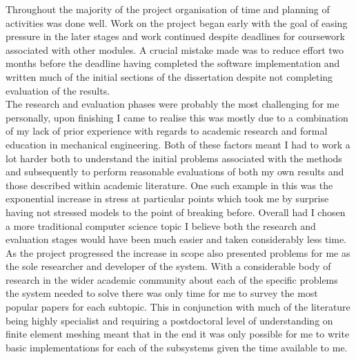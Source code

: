 \noindent
Throughout the majority of the project organisation of time and planning of activities was done well. Work on the project began early with the goal of easing pressure in the later stages and work continued despite deadlines for coursework associated with other modules. A crucial mistake made was to reduce effort two months before the deadline having completed the software implementation and written much of the initial sections of the dissertation despite not completing evaluation of the results. \\

\noindent
The research and evaluation phases were probably the most challenging for me personally, upon finishing I came to realise this was mostly due to a combination of my lack of prior experience with regards to academic research and formal education in mechanical engineering. Both of these factors meant I had to work a lot harder both to understand the initial problems associated with the methods and subsequently to perform reasonable evaluations of both my own results and those described within academic literature. One such example in this was the exponential increase in stress at particular points which took me by surprise having not stressed models to the point of breaking before. Overall had I chosen a more traditional computer science topic I believe both the research and evaluation stages would have been much easier and taken considerably less time. \\ 

\noindent
As the project progressed the increase in scope also presented problems for me as the sole researcher and developer of the system. With a considerable body of research in the wider academic community about each of the specific problems the system needed to solve there was only time for me to survey the most popular papers for each subtopic. This in conjunction with much of the literature being highly specialist and requiring a postdoctoral level of understanding on finite element meshing meant that in the end it was only possible for me to write basic implementations for each of the subsystems given the time available to me. \\ 
  
